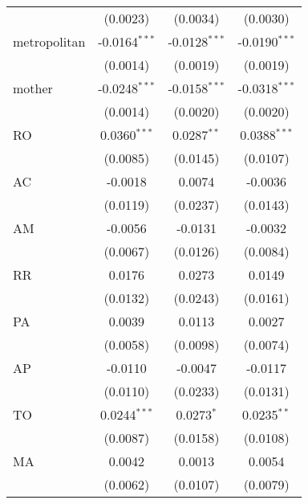 \begin{tabular}{lccc}
                   & (0.0023)                & (0.0034)                & (0.0030)\\   
   metropolitan    & -0.0164$^{***}$         & -0.0128$^{***}$         & -0.0190$^{***}$\\   
                   & (0.0014)                & (0.0019)                & (0.0019)\\   
   mother          & -0.0248$^{***}$         & -0.0158$^{***}$         & -0.0318$^{***}$\\   
                   & (0.0014)                & (0.0020)                & (0.0020)\\   
   RO              & 0.0360$^{***}$          & 0.0287$^{**}$           & 0.0388$^{***}$\\   
                   & (0.0085)                & (0.0145)                & (0.0107)\\   
   AC              & -0.0018                 & 0.0074                  & -0.0036\\   
                   & (0.0119)                & (0.0237)                & (0.0143)\\   
   AM              & -0.0056                 & -0.0131                 & -0.0032\\   
                   & (0.0067)                & (0.0126)                & (0.0084)\\   
   RR              & 0.0176                  & 0.0273                  & 0.0149\\   
                   & (0.0132)                & (0.0243)                & (0.0161)\\   
   PA              & 0.0039                  & 0.0113                  & 0.0027\\   
                   & (0.0058)                & (0.0098)                & (0.0074)\\   
   AP              & -0.0110                 & -0.0047                 & -0.0117\\   
                   & (0.0110)                & (0.0233)                & (0.0131)\\   
   TO              & 0.0244$^{***}$          & 0.0273$^{*}$            & 0.0235$^{**}$\\   
                   & (0.0087)                & (0.0158)                & (0.0108)\\   
   MA              & 0.0042                  & 0.0013                  & 0.0054\\   
                   & (0.0062)                & (0.0107)                & (0.0079)\\   

\end{tabular}
